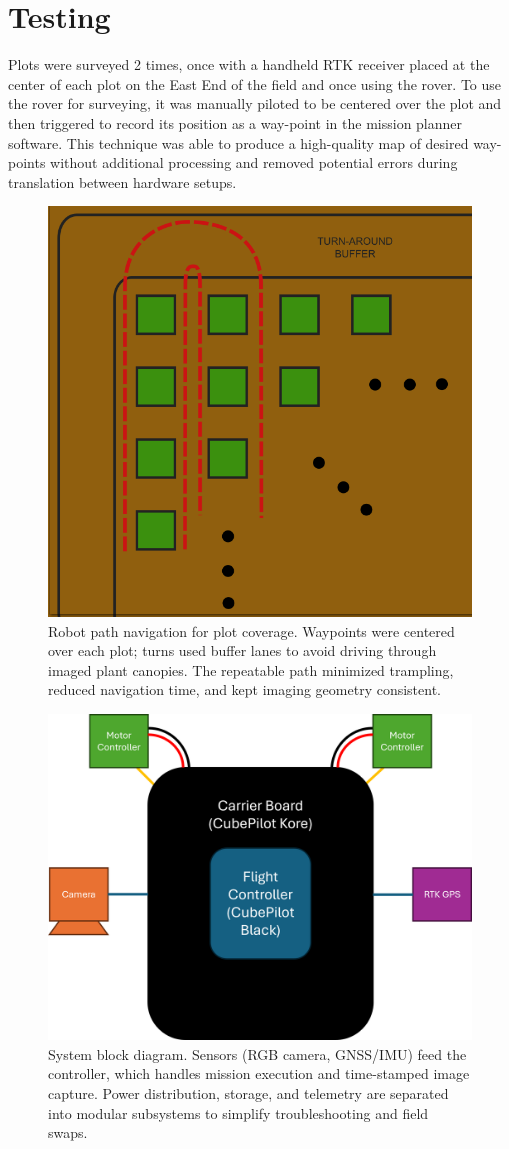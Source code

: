 \section{Testing}

Plots were surveyed 2 times, once with a handheld RTK receiver placed at the center of each plot on the East End of the field and once using the rover. To use the rover for surveying, it was manually piloted to be centered over the plot and then triggered to record its position as a way-point in the mission planner software. This technique was able to produce a high-quality map of desired way-points without additional processing and removed potential errors during translation between hardware setups.

\begin{figure}[!ht]
    \centering
    \includegraphics[width=0.5\linewidth]{images/TurnAround.png}
    \caption{Robot path navigation for plot coverage. Waypoints were centered over each plot; turns used buffer lanes to avoid driving through imaged plant canopies. The repeatable path minimized trampling, reduced navigation time, and kept imaging geometry consistent.}
    \label{fig:path}
\end{figure}

\begin{figure}[!ht]
    \centering
    \includegraphics[width=0.75\linewidth]{images/Block_Dia_1.png}
    \caption{System block diagram. Sensors (RGB camera, GNSS/IMU) feed the controller, which handles mission execution and time-stamped image capture. Power distribution, storage, and telemetry are separated into modular subsystems to simplify troubleshooting and field swaps.}
    \label{fig:Block Diagram}
\end{figure}

